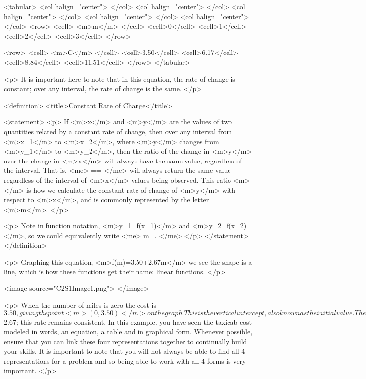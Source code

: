     <tabular>
        <col halign="center"> </col> <col halign="center"> </col> <col halign="center"> </col> <col halign="center"> </col> <col halign="center"> </col>
        <row>
            <cell> <m>m</m> </cell>
            <cell>0</cell>
            <cell>1</cell>
            <cell>2</cell>
            <cell>3</cell>
        </row>

        <row>
            <cell> <m>C</m> </cell>
            <cell>3.50</cell>
            <cell>6.17</cell>
            <cell>8.84</cell>
            <cell>11.51</cell>
        </row>
    </tabular>

    <p>
        It is important here to note that in this equation, the rate of change is constant; over any interval, the rate of change is the same.
    </p>

    <definition>
        <title>Constant Rate of Change</title>

        <statement>
            <p>
                If <m>x</m> and <m>y</m> are the values of two quantities related by a constant rate of change, then over any interval from <m>x_{1}</m> to <m>x_{2}</m>, where <m>y</m> changes from <m>y_{1}</m> to <m>y_{2}</m>, then the ratio of the change in <m>y</m> over the change in <m>x</m> will always have the same value, regardless of the interval.
                That is,
                <me>
                    ==
                </me>
                will always return the same value regardless of the interval of <m>x</m> values being observed.
                This ratio <m></m> is how we calculate the constant rate of change of <m>y</m> with respect to <m>x</m>, and is commonly represented by the letter <m>m</m>.
            </p>

            <p>
                Note in function notation, <m>y_{1}=f(x_{1})</m> and <m>y_{2}=f(x_{2})</m>, so we could equivalently write
                <me>
                    m=.
                </me>
            </p>
        </statement>
    </definition>

    <p>
        Graphing this equation, <m>f(m)=3.50+2.67m</m> we see the shape is a line, which is how these functions get their name: linear functions.
    </p>

    <image source="C2S1Image1.png">
    </image>

    <p>
        When the number of miles is zero the cost is $3.50, giving the point <m>(0, 3.50)</m> on the graph.
        This is the vertical intercept, also known as the initial value.
        The graph is increasing in a straight line from left to right because for each mile the cost goes up by $2.67; this rate remains consistent.
        In this example, you have seen the taxicab cost modeled in words, an equation, a table and in graphical form.
        Whenever possible, ensure that you can link these four representations together to continually build your skills.
        It is important to note that you will not always be able to find all 4 representations for a problem and so being able to work with all 4 forms is very important.
    </p>

